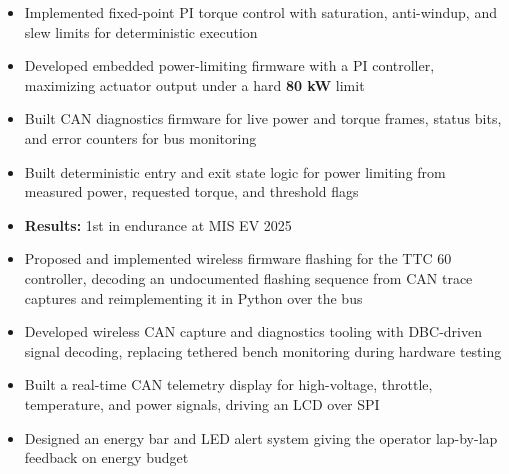 \documentclass[10pt,letterpaper]{article}
\begin{document}
\entryspace

\orgline{\spartanracing}
\begin{itemize}
  \item Implemented fixed-point PI torque control with saturation, anti-windup, and slew limits for deterministic execution
  \item Developed embedded power-limiting firmware with a PI controller, maximizing actuator output under a hard \textbf{80 kW} limit
  \item Built CAN diagnostics firmware for live power and torque frames, status bits, and error counters for bus monitoring
\end{itemize}

\entryspace

\orgline{\spartanracing}
\begin{itemize}
  \item Built deterministic entry and exit state logic for power limiting from measured power, requested torque, and threshold flags
  \item \textbf{Results:} 1st in endurance at MIS EV 2025
\end{itemize}


\begin{itemize}
  \item Proposed and implemented wireless firmware flashing for the TTC 60 controller, decoding an undocumented flashing sequence from CAN trace captures and reimplementing it in Python over the bus
  \item Developed wireless CAN capture and diagnostics tooling with DBC-driven signal decoding, replacing tethered bench monitoring during hardware testing
\end{itemize}

\entryspace

\orgline{\spartanracing}
\begin{itemize}
  \item Built a real-time CAN telemetry display for high-voltage, throttle, temperature, and power signals, driving an LCD over SPI
  \item Designed an energy bar and LED alert system giving the operator lap-by-lap feedback on energy budget
\end{itemize}
\end{document}
